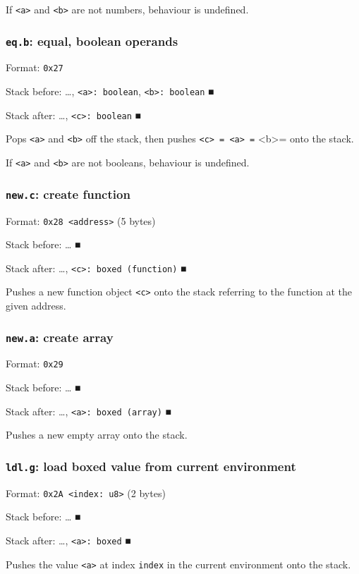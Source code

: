 If \texttt{<a>} and \texttt{<b>} are not numbers, behaviour is undefined.

\subsubsection{\texttt{eq.b}: equal, boolean operands}
\label{sec:org73ca0ae}
Format: \texttt{0x27}

Stack before: \ldots{}​, \texttt{<a>: boolean}, \texttt{<b>: boolean} ■

Stack after: \ldots{}​, \texttt{<c>: boolean} ■

Pops \texttt{<a>} and \texttt{<b>} off the stack, then pushes \texttt{<c> = <a> =} <b>= onto
the stack.

If \texttt{<a>} and \texttt{<b>} are not booleans, behaviour is undefined.

\subsubsection{\texttt{new.c}: create function}
\label{sec:org1d41a06}
Format: \texttt{0x28 <address>} (5 bytes)

Stack before: \ldots{}​ ■

Stack after: \ldots{}​, \texttt{<c>: boxed (function)} ■

Pushes a new function object \texttt{<c>} onto the stack referring to the
function at the given address.

\subsubsection{\texttt{new.a}: create array}
\label{sec:orgcc2c694}
Format: \texttt{0x29}

Stack before: \ldots{}​ ■

Stack after: \ldots{}​, \texttt{<a>: boxed (array)} ■

Pushes a new empty array onto the stack.

\subsubsection{\texttt{ldl.g}: load boxed value from current environment}
\label{sec:orgbae78d9}
Format: \texttt{0x2A <index: u8>} (2 bytes)

Stack before: \ldots{}​ ■

Stack after: \ldots{}​, \texttt{<a>: boxed} ■

Pushes the value \texttt{<a>} at index \texttt{index} in the current environment onto
the stack.

